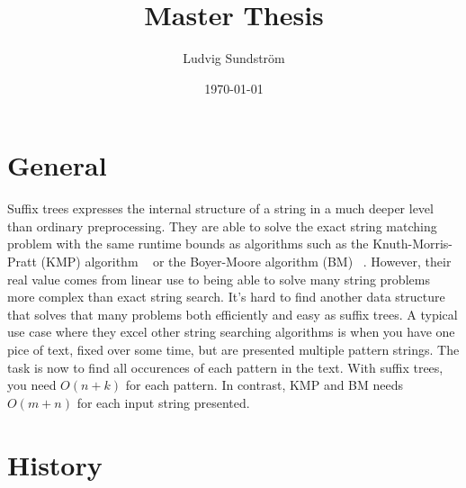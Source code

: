 \documentclass[a4paper]{article}
\title{Master Thesis}
\author{Ludvig Sundstr\"{o}m}
\date{\today}
\begin{document}
\maketitle

\section{General}

Suffix trees expresses the internal structure of a string in a much
deeper level than ordinary preprocessing. They are able to solve the
exact string matching problem with the same runtime bounds as
algorithms such as the Knuth-Morris-Pratt (KMP) algorithm
~\cite{website:knp-wiki} or the Boyer-Moore algorithm (BM)
~\cite{website:bm-wiki}. However, their real value comes from linear
use to being able to solve many string problems more complex than
exact string search. It's hard to find another data structure that
solves that many problems both efficiently and easy as suffix
trees. A typical use case where they excel other string searching
algorithms is when you have one pice of text, fixed over some time,
but are presented multiple pattern strings. The task is now to find
all occurences of each pattern in the text. With suffix trees, you
need $O(n + k)$ for each pattern. In contrast, KMP and BM needs
$O(m + n)$ for each input string presented.

\section{History}

\medskip



\end{document}
